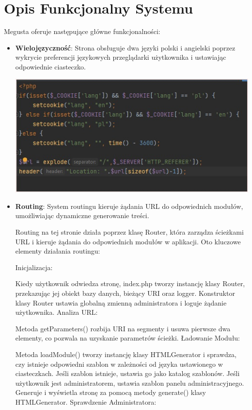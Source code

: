 \documentclass[a4paper,12pt]{report}
\begin{document}
\chapter{Opis Funkcjonalny Systemu}
Megusta oferuje następujące główne funkcjonalności:
\begin{itemize}
    \item \textbf{Wielojęzyczność}: Strona obsługuje dwa języki polski i angielski poprzez wykrycie preferencji językowych przeglądarki użytkownika i ustawiając odpowiednie ciasteczko.
    
\includegraphics[width=\textwidth]{01A_Lokalizacja.jpg}
    
    \item \textbf{Routing}: System routingu kieruje żądania URL do odpowiednich modułów, umożliwiając dynamiczne generowanie treści.

Routing na tej stronie działa poprzez klasę Router, która zarządza ścieżkami URL i kieruje żądania do odpowiednich modułów w aplikacji. Oto kluczowe elementy działania routingu:

Inicjalizacja:

Kiedy użytkownik odwiedza stronę, index.php tworzy instancję klasy Router, przekazując jej obiekt bazy danych, bieżący URI oraz logger.
Konstruktor klasy Router ustawia globalną zmienną administratora i loguje żądanie użytkownika.
Analiza URL:

Metoda getParameters() rozbija URI na segmenty i usuwa pierwsze dwa elementy, co pozwala na uzyskanie parametrów ścieżki.
Ładowanie Modułu:

Metoda loadModule() tworzy instancję klasy HTMLGenerator i sprawdza, czy istnieje odpowiedni szablon w zależności od języka ustawionego w ciasteczkach.
Jeśli szablon istnieje, ustawia go jako katalog szablonów. Jeśli użytkownik jest administratorem, ustawia szablon panelu administracyjnego.
Generuje i wyświetla stronę za pomocą metody generate() klasy HTMLGenerator.
Sprawdzenie Administratora:


\end{itemize}
\end{document}
